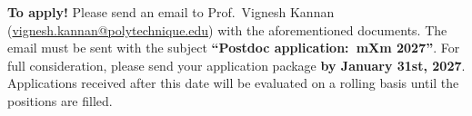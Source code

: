 \documentclass[a4paper,11pt,fleqn]{article}
\begin{document}
	\begin{myhlbox}{\textbf{To apply!}}
		Please {send an email} to {Prof.~Vignesh Kannan} (\href{mailto:vignesh.kannan@polytechnique.edu}{vignesh.kannan@polytechnique.edu}) with the aforementioned documents. The email must be sent with the subject \textbf{``Postdoc application:~mXm 2027''}. For full consideration, please send your application package \textbf{by January 31st, 2027}. Applications received after this date will be evaluated on a rolling basis until the positions are filled. 
	\end{myhlbox}
\end{document}
